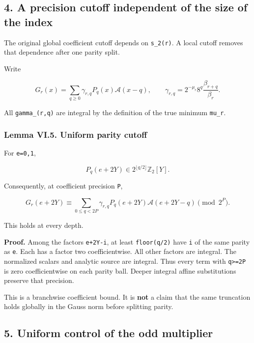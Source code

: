 \documentclass[11pt,letterpaper]{article}
\begin{document}
\subsection{4. A precision cutoff independent of the size of the index}\label{a-precision-cutoff-independent-of-the-size-of-the-index}

The original global coefficient cutoff depends on \texttt{s\_2(r)}. A local cutoff removes that dependence after one parity split.

Write

\[
G_r(x)=\sum_{q\ge0}\gamma_{r,q}P_q(x)\mathscr A(x-q),
\qquad
\gamma_{r,q}=2^{-\mu_r}8^q\frac{\beta_{r+q}}{\beta_r}.
\]

All \texttt{gamma\_(r,q)} are integral by the definition of the true minimum \texttt{mu\_r}.

\subsubsection{Lemma VI.5. Uniform parity cutoff}\label{lemma-vi.5.-uniform-parity-cutoff}

For \texttt{e=0,1},

\[
P_q(e+2Y)\in2^{\lfloor q/2\rfloor}\mathbb Z_2[Y].
\]

Consequently, at coefficient precision \texttt{P},

\[
\boxed{
G_r(e+2Y)\equiv
\sum_{0\le q<2P}\gamma_{r,q}P_q(e+2Y)
\mathscr A(e+2Y-q)\pmod{2^P}.
} \tag{VI.11}
\]

This holds at every depth.

\textbf{Proof.} Among the factors \texttt{e+2Y-i}, at least \texttt{floor(q/2)} have \texttt{i} of the same parity as \texttt{e}. Each has a factor two coefficientwise. All other factors are integral. The normalized scalars and analytic source are integral. Thus every term with \texttt{q\textgreater{}=2P} is zero coefficientwise on each parity ball. Deeper integral affine substitutions preserve that precision.

This is a branchwise coefficient bound. It is \textbf{not} a claim that the same truncation holds globally in the Gauss norm before splitting parity.

\subsection{5. Uniform control of the odd multiplier}\label{uniform-control-of-the-odd-multiplier}
\end{document}
